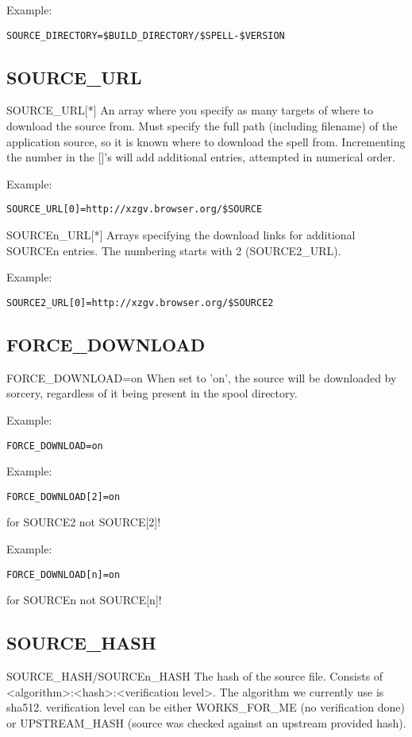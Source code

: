 \documentclass[a4paper,10pt]{book}
\begin{document}
Example:
\begin{verbatim}
SOURCE_DIRECTORY=$BUILD_DIRECTORY/$SPELL-$VERSION
\end{verbatim}

\subsection{SOURCE\_URL}
SOURCE\_URL[*]
	An array where you specify as many targets of where to download the
	source from. Must specify the full path (including filename) of the
	application source, so it is known where to download the spell from.
	Incrementing the number in the []'s will add additional entries,
	attempted in numerical order.

Example:
\begin{verbatim}
SOURCE_URL[0]=http://xzgv.browser.org/$SOURCE
\end{verbatim}

SOURCEn\_URL[*]
	Arrays specifying the download links for additional SOURCEn entries.
	The numbering starts with 2 (SOURCE2\_URL).

Example:
\begin{verbatim}
SOURCE2_URL[0]=http://xzgv.browser.org/$SOURCE2
\end{verbatim}

\subsection{FORCE\_DOWNLOAD}
FORCE\_DOWNLOAD=on
	When set to 'on', the source will be downloaded by sorcery,
	regardless of it being present in the spool directory.

Example:
\begin{verbatim}
FORCE_DOWNLOAD=on
\end{verbatim}

Example:
\begin{verbatim}
FORCE_DOWNLOAD[2]=on
\end{verbatim}
for SOURCE2 not SOURCE[2]!

Example:
\begin{verbatim}
FORCE_DOWNLOAD[n]=on
\end{verbatim}
for SOURCEn not SOURCE[n]!

\subsection{SOURCE\_HASH}
SOURCE\_HASH/SOURCEn\_HASH
	The hash of the source file. Consists of
	<algorithm>:<hash>:<verification level>. The algorithm we currently
	use is sha512. verification level can be either WORKS\_FOR\_ME (no
	verification done) or UPSTREAM\_HASH (source was checked against an
	upstream provided hash).
\end{document}
